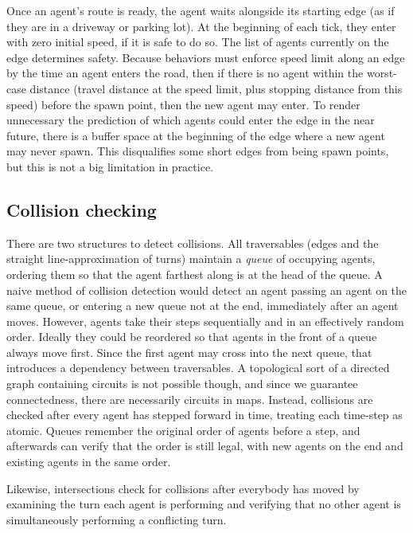 \documentclass[letterpaper, 10 pt, conference]{ieeeconf}  %
\begin{document}
Once an agent's route is ready, the agent waits alongside its starting edge (as
if they are in a driveway or parking lot). At the beginning of each tick, they
enter with zero initial speed, if it is safe to do so. The list of agents
currently on the edge determines safety. Because behaviors must enforce speed
limit along an edge by the time an agent enters the road, then if there is no
agent within the worst-case distance (travel distance at the speed limit, plus
stopping distance from this speed) before the spawn point, then the new agent
may enter. To render unnecessary the prediction of which agents could enter the
edge in the near future, there is a buffer space at the beginning of the edge
where a new agent may never spawn. This disqualifies some short edges from being
spawn points, but this is not a big limitation in practice.

\subsection{Collision checking}

There are two structures to detect collisions. All traversables (edges and the
straight line-approximation of turns) maintain a \emph{queue} of occupying
agents, ordering them so that the agent farthest along is at the head of the
queue. A naive method of collision detection would detect an agent passing an
agent on the same queue, or entering a new queue not at the end, immediately
after an agent moves. However, agents take their steps sequentially and in an
effectively random order. Ideally they could be reordered so that agents in the
front of a queue always move first. Since the first agent may cross into the
next queue, that introduces a dependency between traversables. A topological
sort of a directed graph containing circuits is not possible though, and since
we guarantee connectedness, there are necessarily circuits in maps.  Instead,
collisions are checked after every agent has stepped forward in time, treating
each time-step as atomic. Queues remember the original order of agents before a
step, and afterwards can verify that the order is still legal, with new agents
on the end and existing agents in the same order.

Likewise, intersections check for collisions after everybody has moved by
examining the turn each agent is performing and verifying that no other agent is
simultaneously performing a conflicting turn.
\end{document}
